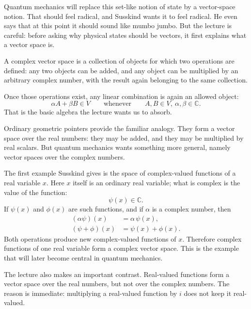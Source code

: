 Quantum mechanics will replace this set-like notion of state by a vector-space notion. That should feel radical, and Susskind wants it to feel radical. He even says that at this point it should sound like mumbo jumbo. But the lecture is careful: before asking why physical states should be vectors, it first explains what a vector space is.

\begin{definition}
A complex vector space is a collection of objects for which two operations are defined: any two objects can be added, and any object can be multiplied by an arbitrary complex number, with the result again belonging to the same collection.
\end{definition}

Once those operations exist, any linear combination is again an allowed object:
\begin{equation}
\alpha A + \beta B \in V
\qquad
\text{whenever}
\qquad
A,B\in V,\ \alpha,\beta\in \mathbb{C}.
\end{equation}
That is the basic algebra the lecture wants us to absorb.

Ordinary geometric pointers provide the familiar analogy. They form a vector space over the real numbers: they may be added, and they may be multiplied by real scalars. But quantum mechanics wants something more general, namely vector spaces over the complex numbers.

The first example Susskind gives is the space of complex-valued functions of a real variable \(x\). Here \(x\) itself is an ordinary real variable; what is complex is the value of the function:
\begin{equation}
\psi(x)\in \mathbb{C}.
\end{equation}
If \(\psi(x)\) and \(\phi(x)\) are such functions, and if \(\alpha\) is a complex number, then
\begin{align}
(\alpha \psi)(x) &= \alpha\,\psi(x),\\
(\psi+\phi)(x) &= \psi(x)+\phi(x).
\end{align}
Both operations produce new complex-valued functions of \(x\). Therefore complex functions of one real variable form a complex vector space. This is the example that will later become central in quantum mechanics.

The lecture also makes an important contrast. Real-valued functions form a vector space over the real numbers, but not over the complex numbers. The reason is immediate: multiplying a real-valued function by \(i\) does not keep it real-valued.


